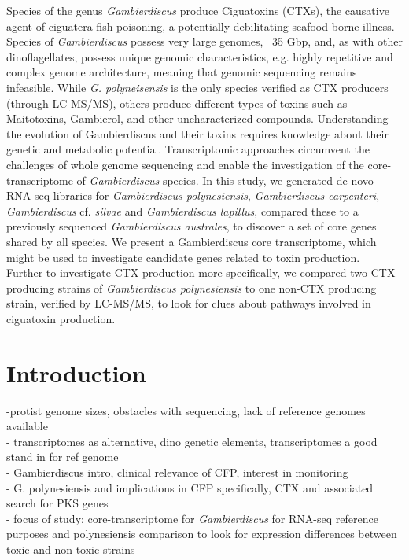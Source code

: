 \documentclass[12pt]{article}
\begin{document}
Species of the genus \textit{Gambierdiscus} produce Ciguatoxins (CTXs), the causative agent of ciguatera fish poisoning, a potentially debilitating seafood borne illness. 
Species of \textit{Gambierdiscus} possess very large genomes, ~35 Gbp, and, as with other dinoflagellates, possess unique genomic characteristics, e.g. highly repetitive and complex genome architecture, meaning that genomic sequencing remains infeasible. 
While \textit{G. polyneisensis} is the only species verified as CTX producers (through LC-MS/MS), others produce different types of toxins such as Maitotoxins, Gambierol, and other uncharacterized compounds. 
Understanding the evolution of Gambierdiscus and their toxins requires knowledge about their genetic and metabolic potential. 
Transcriptomic approaches circumvent the challenges of whole genome sequencing and enable the investigation of the core-transcriptome of \textit{Gambierdiscus} species. 
In this study, we generated de novo RNA-seq libraries for \textit{Gambierdiscus polynesiensis}, \textit{Gambierdiscus carpenteri}, \textit{Gambierdiscus} cf. \textit{silvae} and \textit{Gambierdiscus lapillus}, compared these to a previously sequenced \textit{Gambierdiscus australes}, to discover a set of core genes shared by all species. 
We present a Gambierdiscus core transcriptome, which might be used to investigate candidate genes related to toxin production.\\
Further to investigate CTX production more specifically, we compared two CTX -producing strains of \textit{Gambierdiscus polynesiensis} to one non-CTX producing strain, verified by LC-MS/MS, to look for clues about pathways involved in ciguatoxin production.

\newpage
\section*{Introduction}
-protist genome sizes, obstacles with sequencing, lack of reference genomes available \\
- transcriptomes as alternative, dino genetic elements, transcriptomes a good stand in for ref genome\\
- Gambierdiscus intro, clinical relevance of CFP, interest in monitoring\\
- G. polynesiensis and implications in CFP specifically, CTX and associated search for PKS genes\\
- focus of study: core-transcriptome for \textit{Gambierdiscus} for RNA-seq reference purposes and polynesiensis comparison to look for expression differences between toxic and non-toxic strains
\newpage
\end{document}
